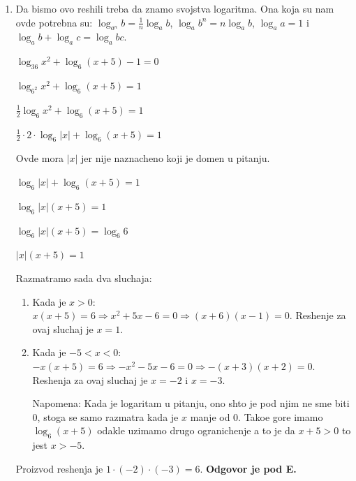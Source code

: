 \documentclass[a4paper,12pt]{article}
\begin{document}
\begin{enumerate}[1.]
\item Da bismo ovo reshili treba da znamo svojstva logaritma. Ona koja su nam ovde potrebna su: $\log_{a^n} b = \frac{1}{n} \log_a b$, $\log_a b^n = n \log_a b$, $\log_a a = 1$ i  $\log_a b + \log_a c = \log_a bc$.
\begin{center}
\par $ \log_{36} x^{2} + \log_6 (x + 5) -1 = 0$
\par $ \log_{6^2} x^{2} + \log_6 (x + 5) = 1$
\par $ \frac{1}{2} \log_6 x^{2} + \log_6 (x + 5) = 1$
\par $ \frac{1}{2} \cdot 2 \cdot \log_6 |x| + \log_6 (x + 5) = 1$
\end{center}
\par Ovde mora $|x|$ jer nije naznacheno koji je domen u pitanju.
\begin{center}
\par $ \log_6 |x| + \log_6 (x + 5) = 1$
\par $ \log_6 |x|(x + 5) = 1$
\par $ \log_6 |x|(x + 5) = \log_6 6$
\par $|x|(x + 5) = 1$
\end{center}
\par Razmatramo sada dva sluchaja:
\begin{enumerate}[1)]
\item Kada je $x > 0$: $x(x+5) = 6 \Longrightarrow x^2 + 5x -6 = 0 \Longrightarrow (x+6)(x-1)=0$. Reshenje za ovaj sluchaj je $x = 1$.
 
\item Kada je $-5 < x < 0$:  $-x(x+5) = 6 \Longrightarrow -x^2 - 5x -6 = 0 \Longrightarrow -(x+3)(x+2)=0$. Reshenja za ovaj sluchaj je $x = -2$ i  $x = -3$.
\par Napomena: Kada je logaritam u pitanju, ono shto je pod njim ne sme biti 0, stoga se samo razmatra kada je $x$ manje od 0. Tako\dj{}e gore imamo $\log_6 (x+5)$ odakle uzimamo drugo ogranichenje a to je da $x+5>0$ to jest $ x > -5$.
\end{enumerate}
\par Proizvod reshenja je $1 \cdot (-2) \cdot (-3) = 6$. \textbf{Odgovor je pod E.} 



\end{enumerate}
\end{document}
